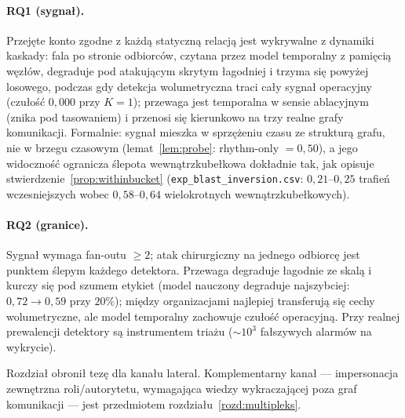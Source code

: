 \paragraph{RQ1 (sygnał).} Przejęte konto zgodne z każdą statyczną
relacją jest wykrywalne z dynamiki kaskady: fala po stronie
odbiorców, czytana przez model temporalny z pamięcią węzłów,
degraduje pod atakującym skrytym łagodniej i trzyma się powyżej
losowego, podczas gdy detekcja wolumetryczna traci cały sygnał
operacyjny (czułość $0{,}000$ przy $K{=}1$); przewaga jest temporalna
w sensie ablacyjnym (znika pod tasowaniem) i przenosi się
kierunkowo na trzy realne grafy komunikacji. Formalnie: sygnał
mieszka w sprzężeniu czasu ze strukturą grafu, nie w brzegu
czasowym (lemat~\ref{lem:probe}: rhythm-only $=0{,}50$), a jego
widoczność ogranicza ślepota wewnątrzkubełkowa dokładnie tak,
jak opisuje stwierdzenie~\ref{prop:withinbucket}
(\texttt{exp\_blast\_inversion.csv}: $0{,}21$--$0{,}25$ trafień
wczesniejszych wobec $0{,}58$--$0{,}64$ wielokrotnych
wewnątrzkubełkowych).

\paragraph{RQ2 (granice).} Sygnał wymaga fan-outu $\ge2$; atak
chirurgiczny na jednego odbiorcę jest punktem ślepym każdego
detektora. Przewaga degraduje łagodnie ze skalą i kurczy się pod
szumem etykiet (model nauczony degraduje najszybciej:
$0{,}72\to0{,}59$ przy $20\%$); między organizacjami najlepiej
transferują się cechy wolumetryczne, ale model temporalny zachowuje
czułość operacyjną. Przy realnej prewalencji detektory są
instrumentem triażu ($\sim\!10^3$ fałszywych alarmów na wykrycie).

Rozdział obronił tezę dla kanału lateral. Komplementarny kanał ---
impersonacja zewnętrzna roli/autorytetu, wymagająca wiedzy
wykraczającej poza graf komunikacji --- jest przedmiotem
rozdziału~\ref{rozd:multipleks}.
